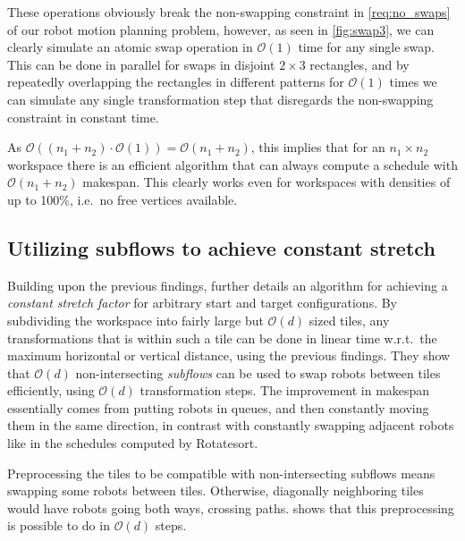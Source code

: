 These operations obviously break the non-swapping constraint in \cref{req:no_swaps} of our robot motion planning problem, however, as seen in \cref{fig:swap3}, we can clearly simulate an atomic swap operation in \(\mathcal{O}(1)\) time for any single swap.
This can be done in parallel for swaps in disjoint \(2 \times 3\) rectangles, and by repeatedly overlapping the rectangles in different patterns for \(\mathcal{O}(1)\) times we can simulate any single transformation step that disregards the non-swapping constraint in constant time.

As \(\mathcal{O}((n_1 + n_2) \cdot \mathcal{O}(1)) = \mathcal{O}(n_1 + n_2)\), this implies that for an \(n_1 \times n_2\) workspace there is an efficient algorithm that can always compute a schedule with \(\mathcal{O}(n_1 + n_2)\) makespan. 
This clearly works even for workspaces with densities of up to 100\%, i.e.~no free vertices available.


\subsection{Utilizing subflows to achieve constant stretch}

Building upon the previous findings, \cite{siamcomp/DemaineFKMS19} further details an algorithm for achieving a \emph{constant stretch factor} for arbitrary start and target configurations.
By subdividing the workspace into fairly large but \(\mathcal{O}(d)\) sized tiles, any transformations that is within such a tile can be done in linear time w.r.t.~the maximum horizontal or vertical distance, using the previous findings.
They show that \(\mathcal{O}(d)\) non-intersecting \emph{subflows} can be used to swap robots between tiles efficiently, using \(\mathcal{O}(d)\) transformation steps.
The improvement in makespan essentially comes from putting robots in queues, and then constantly moving them in the same direction, in contrast with constantly swapping adjacent robots like in the schedules computed by Rotatesort.

Preprocessing the tiles to be compatible with non-intersecting subflows means swapping some robots between tiles. 
Otherwise, diagonally neighboring tiles would have robots going both ways, crossing paths. 
\cite{siamcomp/DemaineFKMS19} shows that this preprocessing is possible to do in \(\mathcal{O}(d)\) steps. 

